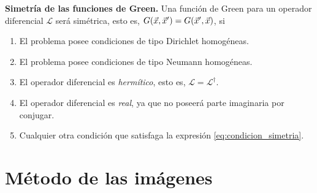 \begin{propiedad}
    \textbf{Simetría de las funciones de Green.} Una función de Green para un operador diferencial $\mathcal{L}$ será simétrica, esto es, $G(\vec{x}, \vec{x}') = G(\vec{x}', \vec{x})$, si 
    \begin{enumerate}
        \item El problema posee condiciones de tipo Dirichlet homogéneas.
        \item El problema posee condiciones de tipo Neumann homogéneas.
        \item El operador diferencial es \emph{hermítico}, esto es, $\mathcal{L} = \mathcal{L}^\dagger$.
        \item El operador diferencial es \emph{real}, ya que no poseerá parte imaginaria por conjugar.
        \item Cualquier otra condición que satisfaga la expresión \eqref{eq:condicion_simetria}.
    \end{enumerate}
\end{propiedad}

\section{Método de las imágenes}

